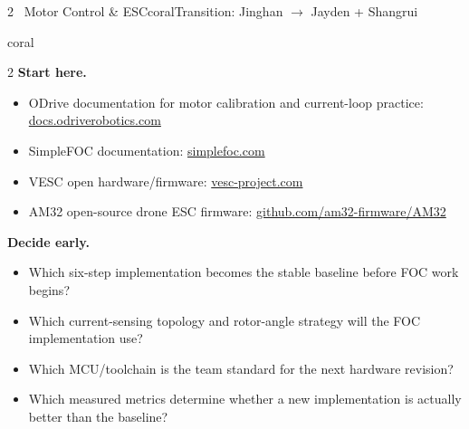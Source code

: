 \documentclass[10pt,a4paper]{article}
\begin{document}
\begin{project}{2 \, Motor Control \& ESC}{coral}{Transition: Jinghan $\rightarrow$ Jayden + Shangrui}
\begin{research}{coral}
\smallskip
\begin{multicols}{2}\RaggedRight
\textbf{Start here.}
\begin{itemize}
  \item ODrive documentation for motor calibration and current-loop practice: \href{https://docs.odriverobotics.com}{docs.odriverobotics.com}
  \item SimpleFOC documentation: \href{https://simplefoc.com}{simplefoc.com}
  \item VESC open hardware/firmware: \href{https://vesc-project.com}{vesc-project.com}
  \item AM32 open-source drone ESC firmware: \href{https://github.com/am32-firmware/AM32}{github.com/am32-firmware/AM32}
\end{itemize}
\columnbreak
\textbf{Decide early.}
\begin{itemize}
  \item Which six-step implementation becomes the stable baseline before FOC work begins?
  \item Which current-sensing topology and rotor-angle strategy will the FOC implementation use?
  \item Which MCU/toolchain is the team standard for the next hardware revision?
  \item Which measured metrics determine whether a new implementation is actually better than the baseline?
\end{itemize}
\end{multicols}
\end{research}
\end{project}
\end{document}
